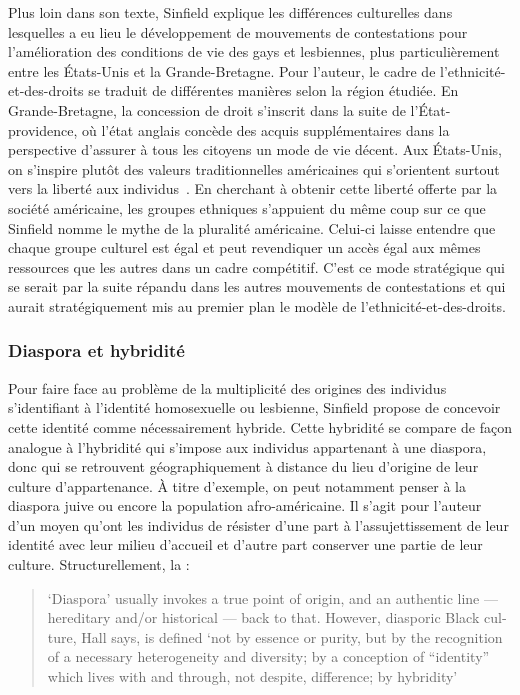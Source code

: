 Plus loin dans son texte, Sinfield explique les différences culturelles dans lesquelles a eu lieu le développement de mouvements de contestations pour l'amélioration des conditions de vie des gays et lesbiennes, plus particulièrement entre les États-Unis et la Grande-Bretagne. 
Pour l'auteur, le cadre de l'ethnicité-et-des-droits se traduit de différentes manières selon la région étudiée. 
En Grande-Bretagne, la concession de droit s'inscrit dans la suite de l'État-providence, où l'état anglais concède des acquis supplémentaires dans la perspective d'assurer à tous les citoyens un mode de vie décent. 
Aux États-Unis, on s'inspire plutôt des valeurs traditionnelles américaines qui s'orientent surtout vers la liberté aux individus~\citep[274]{Sinfield1996}. 
En cherchant à obtenir cette liberté offerte par la société américaine, les groupes ethniques s'appuient du même coup sur ce que Sinfield nomme le mythe de la pluralité américaine. 
Celui-ci laisse entendre que chaque groupe culturel est égal et peut revendiquer un accès égal aux mêmes ressources que les autres dans un cadre compétitif. 
C'est ce mode stratégique qui se serait par la suite répandu dans les autres mouvements de contestations et qui aurait stratégiquement mis au premier plan le modèle de l'ethnicité-et-des-droits.

\subsubsection{Diaspora et hybridité}
\label{sub:diaspora_et_hybridit_} Pour faire face au problème de la multiplicité des origines des individus s'identifiant à l'identité homosexuelle ou lesbienne, Sinfield propose de concevoir cette identité comme nécessairement hybride. 
Cette hybridité se compare de façon analogue à l'hybridité qui s'impose aux individus appartenant à une diaspora, donc qui se retrouvent géographiquement à distance du lieu d'origine de leur culture d'appartenance. 
À titre d'exemple, on peut notamment penser à la diaspora juive ou encore la population afro-américaine.
Il s'agit pour l'auteur d'un moyen qu'ont les individus de résister d'une part à l'assujettissement de leur identité avec leur milieu d'accueil et d'autre part conserver une partie de leur culture. 
Structurellement, la : \foreignblockquote{english}[{\cite[278]{Sinfield1996}}][.]{`Diaspora' \textelp{}   usually invokes a true point of origin, and an authentic line --- hereditary   and/or historical --- back to that. However, diasporic Black culture, Hall says, is defined `not by essence or purity, but by the recognition of a necessary heterogeneity and diversity; by a conception of ``identity'' which lives with and through, not despite, difference; by hybridity'}

